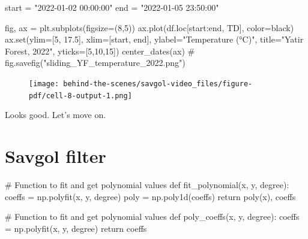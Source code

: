 \documentclass[
  letterpaper,
  DIV=11,
  numbers=noendperiod,
  oneside]{scrreprt}
\newenvironment{Shaded}{\begin{snugshade}}{\end{snugshade}}
\newcommand{\BuiltInTok}[1]{\textcolor[rgb]{0.00,0.23,0.31}{#1}}
\newcommand{\CommentTok}[1]{\textcolor[rgb]{0.37,0.37,0.37}{#1}}
\newcommand{\ControlFlowTok}[1]{\textcolor[rgb]{0.00,0.23,0.31}{#1}}
\newcommand{\DecValTok}[1]{\textcolor[rgb]{0.68,0.00,0.00}{#1}}
\newcommand{\FloatTok}[1]{\textcolor[rgb]{0.68,0.00,0.00}{#1}}
\newcommand{\KeywordTok}[1]{\textcolor[rgb]{0.00,0.23,0.31}{#1}}
\newcommand{\NormalTok}[1]{\textcolor[rgb]{0.00,0.23,0.31}{#1}}
\newcommand{\OperatorTok}[1]{\textcolor[rgb]{0.37,0.37,0.37}{#1}}
\newcommand{\StringTok}[1]{\textcolor[rgb]{0.13,0.47,0.30}{#1}}
\begin{document}
\begin{Shaded}
\begin{Highlighting}[]
\NormalTok{start }\OperatorTok{=} \StringTok{"2022{-}01{-}02 00:00:00"}
\NormalTok{end }\OperatorTok{=} \StringTok{"2022{-}01{-}05 23:50:00"}
\end{Highlighting}
\end{Shaded}

\begin{Shaded}
\begin{Highlighting}[]
\NormalTok{fig, ax }\OperatorTok{=}\NormalTok{ plt.subplots(figsize}\OperatorTok{=}\NormalTok{(}\DecValTok{8}\NormalTok{,}\DecValTok{5}\NormalTok{))}
\NormalTok{ax.plot(df.loc[start:end, }\StringTok{\textquotesingle{}TD\textquotesingle{}}\NormalTok{], color}\OperatorTok{=}\StringTok{\textquotesingle{}black\textquotesingle{}}\NormalTok{)}
\NormalTok{ax.}\BuiltInTok{set}\NormalTok{(ylim}\OperatorTok{=}\NormalTok{[}\DecValTok{5}\NormalTok{, }\FloatTok{17.5}\NormalTok{],}
\NormalTok{       xlim}\OperatorTok{=}\NormalTok{[start, end],}
\NormalTok{       ylabel}\OperatorTok{=}\StringTok{"Temperature (°C)"}\NormalTok{,}
\NormalTok{       title}\OperatorTok{=}\StringTok{"Yatir Forest, 2022"}\NormalTok{,}
\NormalTok{       yticks}\OperatorTok{=}\NormalTok{[}\DecValTok{5}\NormalTok{,}\DecValTok{10}\NormalTok{,}\DecValTok{15}\NormalTok{])}
\NormalTok{center\_dates(ax)}
\CommentTok{\# fig.savefig("sliding\_YF\_temperature\_2022.png")}
\end{Highlighting}
\end{Shaded}

\begin{figure}[H]

{\centering \texttt{[image: behind-the-scenes/savgol-video\_files/figure-pdf/cell-8-output-1.png]}

}

\end{figure}

Looks good. Let's move on.

\hypertarget{savgol-filter}{%
\section{Savgol filter}\label{savgol-filter}}

\begin{Shaded}
\begin{Highlighting}[]
\CommentTok{\# Function to fit and get polynomial values}
\KeywordTok{def}\NormalTok{ fit\_polynomial(x, y, degree):}
\NormalTok{    coeffs }\OperatorTok{=}\NormalTok{ np.polyfit(x, y, degree)}
\NormalTok{    poly }\OperatorTok{=}\NormalTok{ np.poly1d(coeffs)}
    \ControlFlowTok{return}\NormalTok{ poly(x), coeffs}

\CommentTok{\# Function to fit and get polynomial values}
\KeywordTok{def}\NormalTok{ poly\_coeffs(x, y, degree):}
\NormalTok{    coeffs }\OperatorTok{=}\NormalTok{ np.polyfit(x, y, degree)}
    \ControlFlowTok{return}\NormalTok{ coeffs}
\end{Highlighting}
\end{Shaded}
\end{document}
